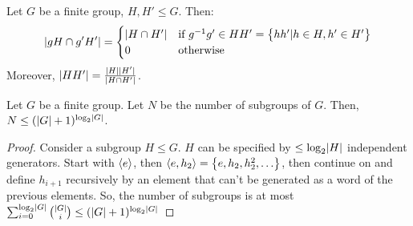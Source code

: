 \begin{lembox}{}
    Let $G$ be a finite group, $H, H' \leq G$. Then:
    \begin{equation}
        \lvert gH \cap g'H' \rvert = \begin{cases}
            \lvert H \cap H' \rvert & \text{if } g^{-1}g' \in HH' = \set{hh' \vert h \in H, h' \in H'}
            \\ 0 & \text{otherwise}
        \end{cases}
    \end{equation}
    Moreover, $\lvert HH' \rvert = \frac{\lvert H \rvert\lvert H' \rvert}{\lvert H\cap H' \rvert}$.
\end{lembox}
\begin{lembox}{}
    Let $G$ be a finite group. Let $N$ be the number of subgroups of $G$. Then, $N \leq (\lvert G \rvert + 1)^{\log_2\lvert G \rvert}$. 
\end{lembox}
\begin{proof}
    Consider a subgroup $H \leq G$. $H$ can be specified by $\leq \log_2\lvert H \rvert$ independent generators. Start with $\left< e \right>$, then $\left< e, h_2 \right> = \set{e, h_2, h_2^2, \ldots}$, then continue on and define $h_{i+1}$ recursively by an element that can't be generated as a word of the previous elements. So, the number of subgroups is at most $\sum_{i=0}^{\log_2\lvert G \rvert}\binom{\lvert G \rvert}{i} \leq (\lvert G \rvert + 1)^{\log_2\lvert G \rvert}$
\end{proof}

